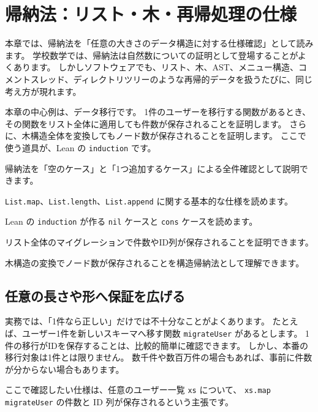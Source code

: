 \chapter{帰納法：リスト・木・再帰処理の仕様}
\label{chap:induction}

\begin{chapterabstract}
本章では、帰納法を「任意の大きさのデータ構造に対する仕様確認」として読みます。
学校数学では、帰納法は自然数についての証明として登場することがよくあります。
しかしソフトウェアでも、リスト、木、AST、メニュー構造、コメントスレッド、ディレクトリツリーのような再帰的データを扱うたびに、同じ考え方が現れます。

本章の中心例は、データ移行です。
1件のユーザーを移行する関数があるとき、その関数をリスト全体に適用しても件数が保存されることを証明します。
さらに、木構造全体を変換してもノード数が保存されることを証明します。
ここで使う道具が、Lean の \texttt{induction} です。
\end{chapterabstract}

\begin{learninggoals}
\item 帰納法を「空のケース」と「1つ追加するケース」による全件確認として説明できます。
\item \texttt{List.map}、\texttt{List.length}、\texttt{List.append} に関する基本的な仕様を読めます。
\item Lean の \texttt{induction} が作る \texttt{nil} ケースと \texttt{cons} ケースを読めます。
\item リスト全体のマイグレーションで件数やID列が保存されることを証明できます。
\item 木構造の変換でノード数が保存されることを構造帰納法として理解できます。
\end{learninggoals}

\section{任意の長さや形へ保証を広げる}

実務では、「1件なら正しい」だけでは不十分なことがよくあります。
たとえば、ユーザー1件を新しいスキーマへ移す関数 \texttt{migrateUser} があるとします。
1件の移行がIDを保存することは、比較的簡単に確認できます。
しかし、本番の移行対象は1件とは限りません。
数千件や数百万件の場合もあれば、事前に件数が分からない場合もあります。

ここで確認したい仕様は、任意のユーザー一覧 \texttt{xs} について、
\texttt{xs.map migrateUser} の件数と ID 列が保存されるという主張です。


